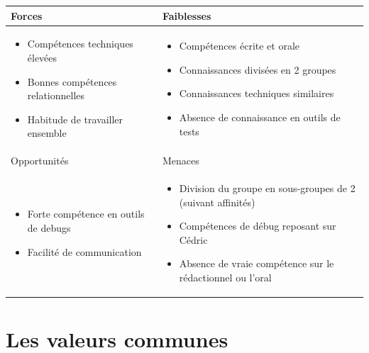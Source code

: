 \documentclass[11pt]{article}
\begin{document}
\begin{center}
  \begin{tabular}{|p{7cm}|p{7cm}|}
    \hline
    Forces & Faiblesses \\
    \hline
    \begin{itemize}
    \item Compétences techniques élevées
    \item Bonnes compétences relationnelles
    \item Habitude de travailler ensemble
    \end{itemize} 
    &
    \begin{itemize}
    \item Compétences écrite et orale
    \item Connaissances divisées en 2 groupes
    \item Connaissances techniques similaires
    \item Absence de connaissance en outils de tests
    \end{itemize}\\
    \hline
    Opportunités & Menaces \tabularnewline
    \hline
    \begin{itemize}
    \item Forte compétence en outils de debugs
    \item Facilité de communication
    \end{itemize} 
    &
    \begin{itemize}
    \item Division du groupe en sous-groupes de 2 (suivant affinités)
    \item Compétences de débug reposant sur Cédric
    \item Absence de vraie compétence sur le rédactionnel ou l'oral
    \end{itemize}\\
    \hline
  \end{tabular}
\end{center}


\section{Les valeurs communes}
\end{document}
